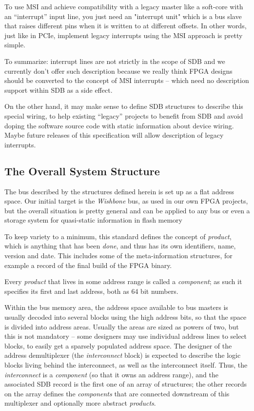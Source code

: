 \documentclass[a4paper, 12pt]{article}
\begin{document}
To use MSI and achieve compatibility with a legacy master like
a soft-core with an ``interrupt'' input line, you just need an
"interrupt unit" which is a bus slave that raises different pins when it
is written to at different offsets. In other words, just like in PCIe,
implement legacy interrupts using the MSI approach is pretty simple.



To summarize: interrupt lines are not strictly in the scope of SDB and
we currently don't offer such description because we really think FPGA
designs should be converted to the concept of MSI interrupts -- which need
no description support within SDB as a side effect.

On the other hand, it may make sense to define SDB structures to
describe this special wiring, to help existing ``legacy'' projects to
benefit from SDB and avoid doping the software source code with static
information about device wiring.  Maybe future releases of this specification
will allow description of legacy interrupts.


\subsection{The Overall System Structure}

The bus described by the structures defined herein is set up as a
flat address space. Our initial target is the \textit{Wishbone} bus,
as used in our own FPGA projects, but the overall situation is
pretty general and can be applied to any bus or even a storage
system for quasi-static information in flash memory

To keep variety to a minimum, this standard defines the concept of
\textit{product}, which is anything that has been \textit{done}, and thus has
its own identifiers, name, version and date.  This includes some of
the meta-information structures, for example a record of the final build of the
FPGA binary.

Every \textit{product} that lives in some address range is called a
\textit{component}; as such it specifies its first and last address, both as
64 bit numbers.

Within the bus memory area, the address space available to bus masters
is usually decoded into several blocks using the high address bits, so
that the space is divided into address areas. Usually the areas are sized
as powers of two, but this is not mandatory -- some designers may use
individual address lines to select blocks, to easily get a sparsely
populated address space.  The designer of the address demultiplexer
(the \textit{interconnect} block) is expected to describe the
logic blocks living behind the interconnect, as well as the
interconnect itself. Thus, the \textit{interconnect} is a \textit{component}
(so that it owns an address range), and the associated SDB record is the first
one of an array of structures; the other records on the array
defines the \textit{components} that are connected downstream of this multiplexer
and optionally more abstract \textit{products}.
\end{document}
